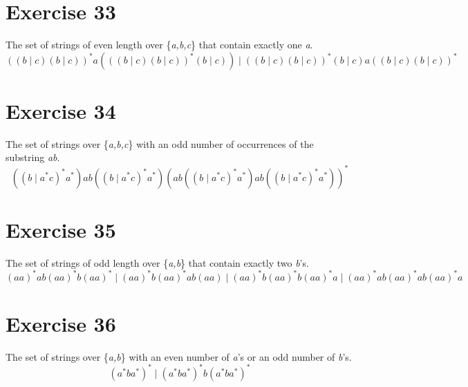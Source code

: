 \documentclass{report}
\begin{document}
\section*{Exercise 33}
The set of strings of even length over \{\textit{a,b,c}\} that contain exactly one \textit{a}.
\newline
$$((b \mid c)(b \mid c))^*a(((b \mid c)(b \mid c))^*(b \mid c))  \mid  ((b \mid c)(b \mid c))^*(b \mid c)a((b \mid c)(b \mid c))^*$$

\section*{Exercise 34}
The set of strings over \{\textit{a,b,c}\} with an odd number of occurrences of the substring \textit{ab}.
\newline
$$((b \mid a^*c)^*a^*) ab ((b \mid a^*c)^*a^*) ( ab ((b \mid a^*c)^*a^*) ab ((b \mid a^*c)^*a^*))^*$$

\section*{Exercise 35}
The set of strings of odd length over \{\textit{a,b}\} that contain exactly two \textit{b}'s.
\newline
$$(aa)^*ab(aa)^*b(aa)^*  \mid  (aa)^*b(aa)^*ab(aa)  \mid  (aa)^*b(aa)^*b(aa)^*a  \mid  (aa)^*ab(aa)^*ab(aa)^*a$$

\section*{Exercise 36}
The set of strings over \{\textit{a,b}\} with an even number of \textit{a}'s or an odd number of \textit{b}'s.
\newline
$$(a^*ba^*)^*  \mid  (a^*ba^*)^*b(a^*ba^*)^*$$
\end{document}
